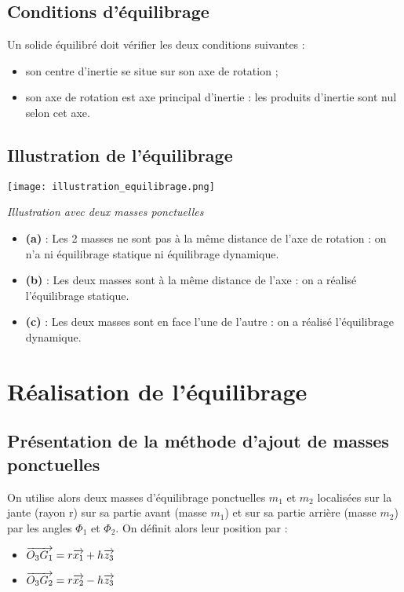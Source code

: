 \subsection{Conditions d'équilibrage}

\begin{defi}
Un solide équilibré doit vérifier les deux conditions suivantes :
\begin{itemize}
\item son centre d'inertie se situe sur son axe de rotation ; 
\item son axe de rotation est axe principal d'inertie : les produits d'inertie sont nul selon cet axe.
\end{itemize}
\end{defi}

\subsection{Illustration de l'équilibrage}


  \begin{center}
  \texttt{[image: illustration\_equilibrage.png]}
  
  \textit{Illustration avec deux masses ponctuelles}
  \end{center}

\begin{itemize}
\item \textbf{(a)} : Les 2 masses ne sont pas à la même distance de l'axe de rotation : on n'a ni équilibrage statique ni équilibrage dynamique.
\item \textbf{(b)} : Les deux masses sont à la même distance de l'axe : on a réalisé l'équilibrage statique.
\item \textbf{(c)} : Les deux masses sont en face l'une de l'autre : on a réalisé l'équilibrage dynamique.
\end{itemize}


\section{Réalisation de l'équilibrage}
\subsection{Présentation de la méthode d'ajout de masses ponctuelles}
On utilise alors deux masses d'équilibrage ponctuelles $m_1$ et $m_2$ localisées sur la jante (rayon r) sur sa partie avant (masse $m_1$) et sur sa partie arrière (masse $m_2$) par les angles $\Phi_1$ et $\Phi_2$.
On définit alors leur position par :
\begin{itemize}
\item $\overrightarrow{O_3G_1}=r \overrightarrow{x_1}+h\overrightarrow{z_3}$
\item $\overrightarrow{O_3G_2}=r \overrightarrow{x_2}-h\overrightarrow{z_3}$
\end{itemize}


